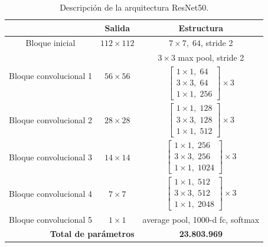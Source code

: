 \bgroup
\begin{table}[htp]
  \scriptsize
  \begin{center}
    \begin{tabular}[b]{|c|c|c|}
      \hline
      \rowcolor[HTML]{FFC702}
      \multicolumn{1}{|c|}{\textbf{Capa}} & \multicolumn{1}{c|}{\textbf{Salida}}  &
      \multicolumn{1}{c|}{\textbf{Estructura}} \\
      \hline
      Bloque inicial & $112\times112$ & $7\times7,\; 64$, stride 2 \\ 
      \hline 
      \multirow{2}{*}{Bloque convolucional 1} & \multirow{2}{*}{$56\times56$} & $3\times3$ max pool, stride 2 \\ 
      \cline{3-3}
                                              & & $\begin{bmatrix}1\times1,\; 64 \\ 3\times3,\; 64 \\ 1\times1,\; 256 \end{bmatrix}\times 3$ \\ 
      \hline
      Bloque convolucional 2 & $28\times28$ & $\begin{bmatrix}1\times1,\; 128 \\ 3\times3,\; 128 \\ 1\times1,\; 512 \end{bmatrix}  \times 3 $\\ 
      \hline
      Bloque convolucional 3 & $14\times14$ & $\begin{bmatrix}1\times1,\; 256 \\ 3\times3,\; 256 \\ 1\times1,\; 1024 \end{bmatrix} \times 3$ \\ 
      \hline
      Bloque convolucional 4 & $7\times7$   & $\begin{bmatrix}1\times1,\; 512 \\ 3\times3,\; 512 \\ 1\times1,\; 2048 \end{bmatrix}  \times 3 $\\ 
      \hline
      Bloque convolucional 5 & $1\times1$   & average pool, 1000-d fc, softmax\\ 
      \hline
      \multicolumn{2}{|r|}{\cellcolor[HTML]{FFC702}\textbf{Total de parámetros}} & \textbf{23.803.969}\\
      \hline 
      \end{tabular}
  \end{center}
  \caption{Descripción de la arquitectura ResNet50.}
  \label{tab:ResNet50}
\end{table}
\egroup

